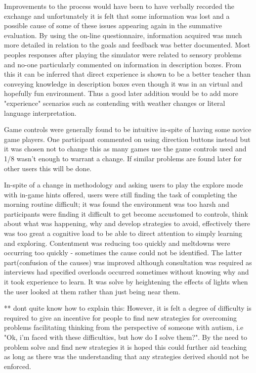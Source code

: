 Improvements to the process would have been to have verbally recorded the exchange and unfortunately it is felt that some information was lost and a possible cause of some of these issues appearing again in the summative evaluation. By using the on-line questionnaire, information acquired was much more detailed in relation to the goals and feedback was better documented. Most peoples responses after playing the simulator were related to sensory problems and no-one particularly commented on information in description boxes. From this it can be inferred that direct experience is shown to be a better teacher than conveying knowledge in description boxes even though it was in an virtual and hopefully fun environment. Thus a good later addition would be to add more "experience" scenarios such as contending with weather changes or literal language interpretation.  

Game controls were generally found to be intuitive in-spite of having some novice game players. One participant commented on using direction buttons instead but it was chosen not to change this as many games use the game controls used and 1/8 wasn't enough to warrant a change. If similar problems are found later for other users this will be done. 

In-spite of a change in methodology and asking users to play the explore mode with in-game hints offered, users were still finding the task of completing the morning routine difficult; it was found the environment was too harsh and participants were finding it difficult to get become accustomed to controls, think about what was happening, why and develop strategies to avoid, effectively there was too great a cognitive load to be able to direct attention to simply learning and exploring. Contentment was reducing too quickly and meltdowns were occurring too quickly - sometimes the cause could not be identified. The latter part(confusion of the causes) was improved although consultation was required as interviews had specified overloads occurred sometimes without knowing why and it took experience to learn. It was solve by heightening the effects of lights when the user looked at them rather than just being near them.

** dont quite know how to explain this: However, it is felt a degree of difficulty is required to give an incentive for people to find new strategies for overcoming problems facilitating thinking from the perspective of someone with autism, i.e "Ok, i'm faced with these difficulties, but how do I solve them?". By the need to problem solve and find new strategies it is hoped this could further aid teaching as long as there was the understanding that any strategies derived should not be enforced. 

